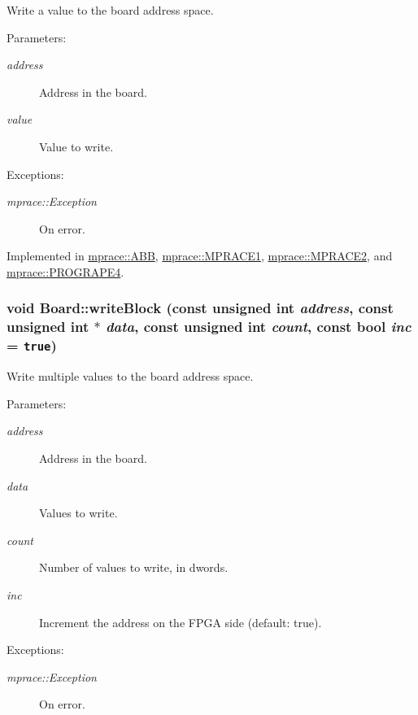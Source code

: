 Write a value to the board address space. 

\begin{Desc}
\item[Parameters:]
\begin{description}
\item[{\em address}]Address in the board. \item[{\em value}]Value to write. \end{description}
\end{Desc}
\begin{Desc}
\item[Exceptions:]
\begin{description}
\item[{\em mprace::Exception}]On error.\end{description}
\end{Desc}


Implemented in \hyperlink{classmprace_1_1ABB_a4}{mprace::ABB}, \hyperlink{classmprace_1_1MPRACE1_a2}{mprace::MPRACE1}, \hyperlink{classmprace_1_1MPRACE2_a2}{mprace::MPRACE2}, and \hyperlink{classmprace_1_1PROGRAPE4_a2}{mprace::PROGRAPE4}.\hypertarget{classmprace_1_1Board_a5}{
\subsubsection[writeBlock]{\setlength{\rightskip}{0pt plus 5cm}void Board::write\-Block (const unsigned int {\em address}, const unsigned int $\ast$ {\em data}, const unsigned int {\em count}, const bool {\em inc} = {\tt true})}}
\label{classmprace_1_1Board_a5}


Write multiple values to the board address space. 

\begin{Desc}
\item[Parameters:]
\begin{description}
\item[{\em address}]Address in the board. \item[{\em data}]Values to write. \item[{\em count}]Number of values to write, in dwords. \item[{\em inc}]Increment the address on the FPGA side (default: true). \end{description}
\end{Desc}
\begin{Desc}
\item[Exceptions:]
\begin{description}
\item[{\em mprace::Exception}]On error.\end{description}
\end{Desc}


